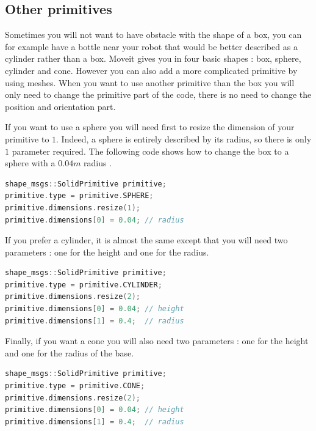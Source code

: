 \subsection{Other primitives}
Sometimes you will not want to have obstacle with the shape of a box, you can for example have a bottle near your robot that would be better described as a cylinder rather than a box. Moveit gives you in four basic shapes : box, sphere, cylinder and cone. However you can also add a more complicated primitive by using meshes. When you want to use another primitive than the box you will only need to change the primitive part of the code, there is no need to change the position and orientation part.

If you want to use a sphere you will need first to resize the dimension of your primitive to $1$. Indeed, a sphere is entirely described by its radius, so there is only $1$ parameter required. The following code shows how to change the box to a sphere with a $0.04m$ radius .

\begin{lstlisting}[language=c++]
shape_msgs::SolidPrimitive primitive;
primitive.type = primitive.SPHERE;
primitive.dimensions.resize(1);
primitive.dimensions[0] = 0.04; // radius
\end{lstlisting}

If you prefer a cylinder, it is almost the same except that you will need two parameters : one for the height and one for the radius.


\begin{lstlisting}[language=c++]
shape_msgs::SolidPrimitive primitive;
primitive.type = primitive.CYLINDER;
primitive.dimensions.resize(2);
primitive.dimensions[0] = 0.04; // height
primitive.dimensions[1] = 0.4;  // radius
\end{lstlisting}

Finally,  if you want a cone you will also need two parameters : one for the height and one for the radius of the base.

\begin{lstlisting}[language=c++]
shape_msgs::SolidPrimitive primitive;
primitive.type = primitive.CONE;
primitive.dimensions.resize(2);
primitive.dimensions[0] = 0.04; // height
primitive.dimensions[1] = 0.4;  // radius
\end{lstlisting}